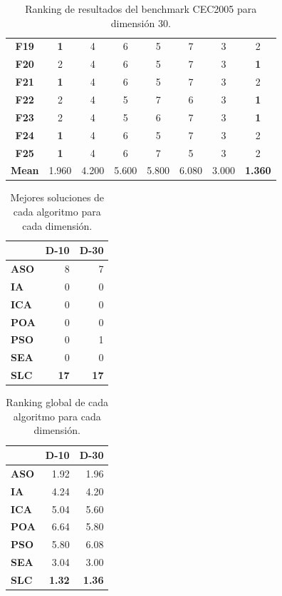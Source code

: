 \begin{table}
\begin{tabular}{cccccccc}
		\textbf{F19}  &      \textbf{1} &      4 &      6 &      5 &      7 &      3 &      2 \\
		\textbf{F20}  &      2 &      4 &      6 &      5 &      7 &      3 &      \textbf{1} \\
		\textbf{F21}  &      \textbf{1} &      4 &      6 &      5 &      7 &      3 &      2 \\
		\textbf{F22}  &      2 &      4 &      5 &      7 &      6 &      3 &      \textbf{1} \\
		\textbf{F23}  &      2 &      4 &      5 &      6 &      7 &      3 &      \textbf{1} \\
		\textbf{F24}  &      \textbf{1} &      4 &      6 &      5 &      7 &      3 &      2 \\
		\textbf{F25}  &      \textbf{1} &      4 &      6 &      7 &      5 &      3 &      2 \\
		\textbf{Mean} &  1.960 &  4.200 &  5.600 &  5.800 &  6.080 &  3.000 &  \textbf{1.360} \\
		\bottomrule
	\end{tabular}
	\caption{Ranking de resultados del benchmark CEC2005 para dimensión 30.}\label{t:ranking-30}
\end{table}

\begin{table}
	\centering
	\begin{tabular}{lrr}
		\toprule
		{} &  \textbf{D-10} &  \textbf{D-30} \\
		\midrule
		\textbf{ASO} &   8 &   7 \\
		\textbf{IA}  &   0 &   0 \\
		\textbf{ICA} &   0 &   0 \\
		\textbf{POA} &   0 &   0 \\
		\textbf{PSO} &   0 &   1 \\
		\textbf{SEA} &   0 &   0 \\
		\textbf{SLC} &  \textbf{17} &  \textbf{17} \\
		\bottomrule
	\end{tabular}
	\caption{Mejores soluciones de cada algoritmo para cada dimensión.}\label{t:best-global}
\end{table}

\begin{table}
	\centering
	\begin{tabular}{lrr}
		\toprule
		{} &    \textbf{D-10} &    \textbf{D-30} \\
		\midrule
		\textbf{ASO} &  1.92 &  1.96 \\
		\textbf{IA}  &  4.24 &  4.20 \\
		\textbf{ICA} &  5.04 &  5.60 \\
		\textbf{POA} &  6.64 &  5.80 \\
		\textbf{PSO} &  5.80 &  6.08 \\
		\textbf{SEA} &  3.04 &  3.00 \\
		\textbf{SLC} &  \textbf{1.32} &  \textbf{1.36} \\
		\bottomrule
	\end{tabular}
	\caption{Ranking global de cada algoritmo para cada dimensión.}\label{t:ranking-global}
\end{table}

